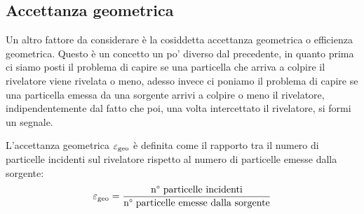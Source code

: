   \subsection{Accettanza geometrica}
  Un altro fattore da considerare è la cosiddetta accettanza geometrica o efficienza geometrica. Questo è un concetto un po' diverso dal precedente, in quanto prima ci siamo posti il problema di capire se una particella che arriva a colpire il rivelatore viene rivelata o meno, adesso invece ci poniamo il problema di capire se una particella emessa da una sorgente arrivi a colpire o meno il rivelatore, indipendentemente dal fatto che poi, una volta intercettato il rivelatore, si formi un segnale.
  
  L'accettanza geometrica $\varepsilon_{\rm geo}$ è definita come il rapporto tra il numero di particelle incidenti sul rivelatore rispetto al numero di particelle emesse dalla sorgente:
  \begin{equation*}
   \varepsilon_{\rm geo}
   =\frac{\text{n° particelle incidenti}}{\text{n° particelle emesse dalla sorgente}}
  \end{equation*}
